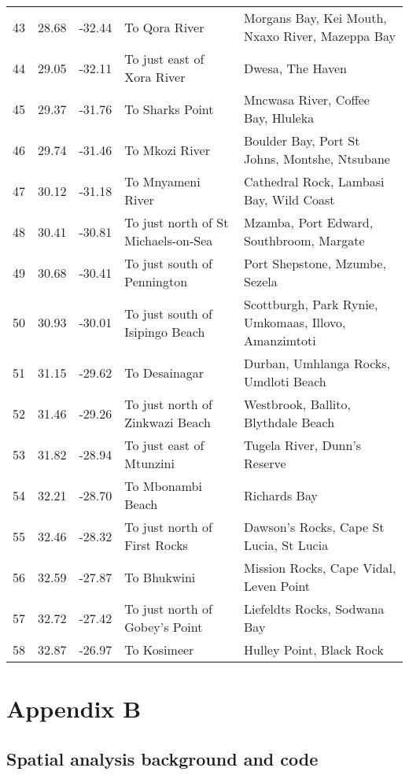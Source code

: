 \documentclass[10pt,A4,]{article}
\begin{document}
\begin{tiny}
\begin{center}
\begin{longtable}{|r|r|r|l|p{6cm}|}
43 & 28.68 & -32.44 & To Qora River & Morgans Bay, Kei Mouth, Nxaxo River, Mazeppa Bay \\
44 & 29.05 & -32.11 & To just east of Xora River & Dwesa, The Haven \\
45 & 29.37 & -31.76 & To Sharks Point & Mncwasa River, Coffee Bay, Hluleka \\
46 & 29.74 & -31.46 & To Mkozi River & Boulder Bay, Port St Johns, Montshe, Ntsubane \\
47 & 30.12 & -31.18 & To Mnyameni River & Cathedral Rock, Lambasi Bay, Wild Coast \\
48 & 30.41 & -30.81 & To just north of St Michaels-on-Sea & Mzamba, Port Edward, Southbroom, Margate \\
49 & 30.68 & -30.41 & To just south of Pennington & Port Shepstone, Mzumbe, Sezela \\
50 & 30.93 & -30.01 & To just south of Isipingo Beach & Scottburgh, Park Rynie, Umkomaas, Illovo, Amanzimtoti \\
51 & 31.15 & -29.62 & To Desainagar & Durban, Umhlanga Rocks, Umdloti Beach \\
52 & 31.46 & -29.26 & To just north of Zinkwazi Beach & Westbrook, Ballito, Blythdale Beach \\
53 & 31.82 & -28.94 & To just east of Mtunzini & Tugela River, Dunn’s Reserve \\
54 & 32.21 & -28.70 & To Mbonambi Beach & Richards Bay \\
55 & 32.46 & -28.32 & To just north of First Rocks & Dawson’s Rocks, Cape St Lucia, St Lucia \\
56 & 32.59 & -27.87 & To Bhukwini & Mission Rocks, Cape Vidal, Leven Point \\
57 & 32.72 & -27.42 & To just north of Gobey’s Point & Liefeldts Rocks, Sodwana Bay \\
58 & 32.87 & -26.97 & To Kosimeer & Hulley Point, Black Rock \\

\end{longtable}
\end{center}
\end{tiny}

\newpage

\section*{\large{Appendix B}}

\subsection*{Spatial analysis background and code}
\end{document}

